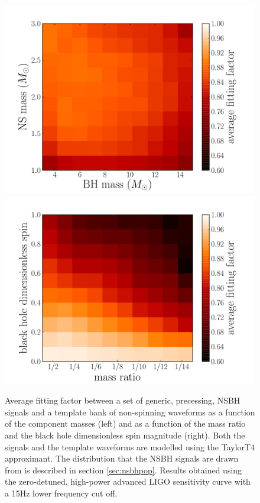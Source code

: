 \begin{figure}
    \centering
    \begin{minipage}[l]{\columnwidth}
    \centering
\includegraphics[width=1.0\textwidth]
{papers/nsbh_effectualness/figure8A.pdf}
\includegraphics[width=1.0\textwidth]
{papers/nsbh_effectualness/figure8B.pdf}
\caption{\label{fig:nonspinavFF}
Average fitting factor between a set of generic, precessing, NSBH signals and a
template bank of non-spinning waveforms as a function of the component masses
(left) and as a function of the mass ratio and the black hole dimensionless spin
magnitude (right). Both the signals and the template waveforms are modelled
using the TaylorT4 approximant. The distribution that the NSBH
signals are drawn from is described in section \ref{sec:nsbhpop}.
Results obtained
using the zero-detuned, high-power advanced LIGO sensitivity curve with a 15Hz
lower frequency cut off.
}
\end{minipage}
\end{figure}


